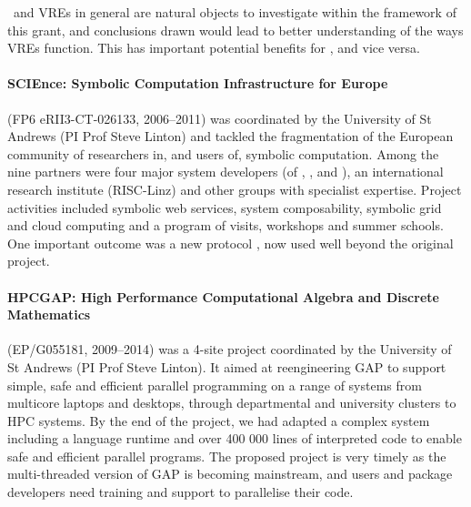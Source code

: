 \TheProject\ and VREs in general are natural objects to investigate
within the framework of this grant, and conclusions drawn would lead to better understanding
of the ways VREs function. This has important potential benefits for \TheProject, and
vice versa.



\paragraph{SCIEnce: Symbolic Computation Infrastructure for Europe}
(FP6 eRII3-CT-026133, 2006--2011) was coordinated by the University
of St Andrews (PI Prof Steve Linton) and tackled the fragmentation of the
European community of researchers in, and users of, symbolic computation.
Among the nine partners were four major system developers (of \GAP,
\Maple, \MuPAD and \KANT), an international research institute (RISC-Linz)
and other groups with specialist expertise. Project activities
included symbolic web services, system composability, symbolic
grid and cloud computing and a program of visits, workshops and
summer schools. One important outcome was a new protocol \SCSCP,
now used well beyond the original project.

\paragraph{HPCGAP: High Performance Computational Algebra and
Discrete Mathematics} (EP/G055181, 2009--2014) was a 4-site project
coordinated by the University of St Andrews (PI Prof Steve Linton). It aimed
at reengineering GAP to support simple, safe and efficient parallel
programming on a range of systems from multicore laptops and desktops,
through departmental and university clusters to HPC systems. By the
end of the project, we had adapted a complex system including a
language runtime and over 400 000 lines of interpreted code to enable
safe and efficient parallel programs. The proposed project is very timely as
the multi-threaded version of GAP is becoming mainstream, and users and
package developers need training and support to parallelise their code.

